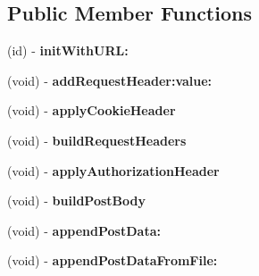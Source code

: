 \subsection*{\-Public \-Member \-Functions}
\begin{DoxyCompactItemize}
\item 
\hypertarget{interface_a_s_i_h_t_t_p_request_aec75eeba26544a9da35e795011fe4a42}{
(id) -\/ {\bfseries init\-With\-U\-R\-L\-:}}
\label{interface_a_s_i_h_t_t_p_request_aec75eeba26544a9da35e795011fe4a42}

\item 
\hypertarget{interface_a_s_i_h_t_t_p_request_a0e969f091acb07bbbe6dbc9295260d64}{
(void) -\/ {\bfseries add\-Request\-Header\-:value\-:}}
\label{interface_a_s_i_h_t_t_p_request_a0e969f091acb07bbbe6dbc9295260d64}

\item 
\hypertarget{interface_a_s_i_h_t_t_p_request_a96645d25afb711168d8722089ad0da60}{
(void) -\/ {\bfseries apply\-Cookie\-Header}}
\label{interface_a_s_i_h_t_t_p_request_a96645d25afb711168d8722089ad0da60}

\item 
\hypertarget{interface_a_s_i_h_t_t_p_request_a84fd344945df932bb1499066a6136b44}{
(void) -\/ {\bfseries build\-Request\-Headers}}
\label{interface_a_s_i_h_t_t_p_request_a84fd344945df932bb1499066a6136b44}

\item 
\hypertarget{interface_a_s_i_h_t_t_p_request_a585f10faa599a2d9c27a5013653901e8}{
(void) -\/ {\bfseries apply\-Authorization\-Header}}
\label{interface_a_s_i_h_t_t_p_request_a585f10faa599a2d9c27a5013653901e8}

\item 
\hypertarget{interface_a_s_i_h_t_t_p_request_a03e252428a7cee3ce6c67a33d93adfb4}{
(void) -\/ {\bfseries build\-Post\-Body}}
\label{interface_a_s_i_h_t_t_p_request_a03e252428a7cee3ce6c67a33d93adfb4}

\item 
\hypertarget{interface_a_s_i_h_t_t_p_request_ad74dabdd3aeb97b1cfcf95a05fea9bcc}{
(void) -\/ {\bfseries append\-Post\-Data\-:}}
\label{interface_a_s_i_h_t_t_p_request_ad74dabdd3aeb97b1cfcf95a05fea9bcc}

\item 
\hypertarget{interface_a_s_i_h_t_t_p_request_a5496e23e12b1ec7d6d02a78aa6777d10}{
(void) -\/ {\bfseries append\-Post\-Data\-From\-File\-:}}
\label{interface_a_s_i_h_t_t_p_request_a5496e23e12b1ec7d6d02a78aa6777d10}


\end{DoxyCompactItemize}
